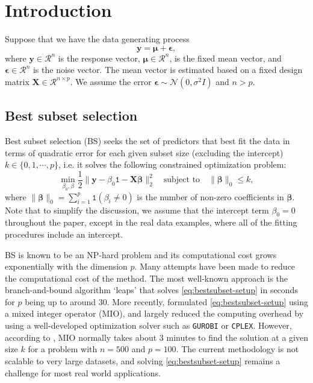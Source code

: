 \section{Introduction}
Suppose that we have the data generating process
\begin{equation}
\mathbf{y}=\mathbf{\mu}+\mathbf{\epsilon},
\label{eq:truemodel_def}
\end{equation}
where $\mathbf{y}\in \mathcal{R}^n$ is the response vector, $\mathbf{\mu} \in \mathcal{R}^n$, is the fixed mean vector, and $\mathbf{\epsilon} \in \mathcal{R}^n$ is the noise vector. The mean vector is estimated based on a fixed design matrix $\mathbf{X}\in \mathcal{R}^{n\times p}$. We assume the error $\mathbf{\epsilon} \sim \mathcal{N}(0,\sigma^2 I)$ and $n > p$.

\subsection{Best subset selection}
Best subset selection (BS) \citep{Hocking1967} seeks the set of predictors that best fit the data in terms of quadratic error for each given subset size (excluding the intercept) $k\in\{0,1,\cdots,p\}$, i.e. it solves the following constrained optimization problem:
\begin{equation}
\min_{\beta_0, \beta} \frac{1}{2} \lVert \mathbf{y}-\beta_0\mathtt{1} -\mathbf{X\beta}\rVert_2^2 \quad \text{subject to} \quad \lVert \mathbf{\beta} \rVert_0 \le k,
\label{eq:bestsubset-setup}
\end{equation}
where $\lVert \mathbf{\beta} \rVert_0 = \sum_{i=1}^{p} \mathtt{1}(\beta_i \ne 0)$ is the number of non-zero coefficients in $\mathbf{\beta}$. Note that to simplify the discussion, we assume that the intercept term $\beta_0=0$ throughout the paper, except in the real data examples, where all of the fitting procedures include an intercept.


BS is known to be an NP-hard problem \citep{Natarajan1995} and its computational cost grows exponentially with the dimension $p$. Many attempts have been made to reduce the computational cost of the method. The most well-known approach is the branch-and-bound algorithm `leaps' \citep{Furnival1974} that solves \eqref{eq:bestsubset-setup} in seconds for $p$ being up to around $30$. More recently, \citet{Bertsimas2016} formulated \eqref{eq:bestsubset-setup} using a mixed integer operator (MIO), and largely reduced the computing overhead by using a well-developed optimization solver such as {\tt GUROBI} or {\tt CPLEX}. However, according to \citet{Hastie2017}, MIO normally takes about $3$ minutes to find the solution at a given size $k$ for a problem with $n=500$ and $p=100$. The current methodology is not scalable to very large datasets, and solving \eqref{eq:bestsubset-setup} remains a challenge for most real world applications.

